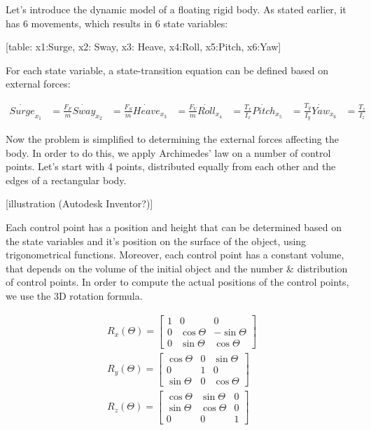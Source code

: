 Let's introduce the dynamic model of a floating rigid body. As stated earlier, it has 6 movements, which results in 6 state variables:

[table: x1:Surge, x2: Sway, x3: Heave, x4:Roll, x5:Pitch, x6:Yaw]

For each state variable, a state-transition equation can be defined based on external forces:

\begin{align}
\dot{Surge}_x_1 &= \frac{F_F}{m}
\dot{Sway}_x_2  &= \frac{F_S}{m}
\dot{Heave}_x_3 &= \frac{F_V}{m}
\dot{Roll}_x_4  &= \frac{T_x}{I_x}
\dot{Pitch}_x_5 &= \frac{T_y}{I_y}
\dot{Yaw}_x_6   &= \frac{T_z}{I_z}
\end{align}

Now the problem is simplified to determining the external forces affecting the body. In order to do this, we apply Archimedes' law\cite{archimedes} on a number of control points. Let's start with 4 points, distributed equally from each other and the edges of a rectangular body.

[illustration (Autodesk Inventor?)]

Each control point has a position and height that can be determined based on the state variables and it's position on the surface of the object, using trigonometrical functions. Moreover, each control point has a constant volume, that depends on the volume of the initial object and the number \& distribution of control points. In order to compute the actual positions of the control points, we use the 3D rotation formula.

\begin{align}
	R_x(\Theta) = 
	\begin{bmatrix}
		1 & 0 & 0 \\
		0 & \cos \Theta & -\sin \Theta \\
		0 & \sin \Theta & \cos \Theta
	\end{bmatrix} \\
	R_y(\Theta) = 
	\begin{bmatrix}
		\cos \Theta & 0 & \sin \Theta \\
		0 & 1 & 0 \\
		\sin \Theta & 0 &\cos \Theta
	\end{bmatrix}
 \\
	R_z(\Theta) = 
	\begin{bmatrix}
		\cos \Theta & \sin \Theta & 0 \\
		\sin \Theta & \cos \Theta & 0 \\
		0 & 0 & 1
	\end{bmatrix}

\end{align}

